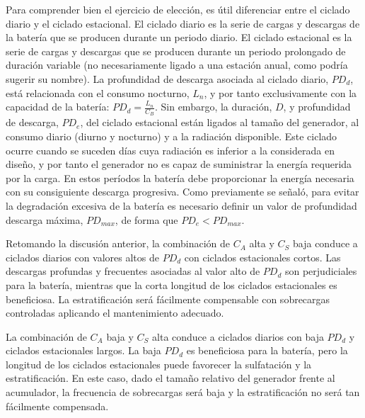 Para comprender bien el ejercicio de elección, es útil diferenciar
entre el ciclado diario y el ciclado estacional. El ciclado diario
es la serie de cargas y descargas de la batería que se producen durante
un periodo diario. El ciclado estacional es la serie de cargas y descargas
que se producen durante un periodo prolongado de duración variable
(no necesariamente ligado a una estación anual, como podría sugerir
su nombre). La profundidad de descarga asociada al ciclado diario,
$PD_{d}$,
está relacionada con el consumo nocturno, $L_{n}$,
y por tanto exclusivamente con la capacidad de la batería: $PD_{d}=\frac{L_{n}}{C_{B}}$.
Sin embargo, la duración, $D$, y profundidad de descarga, $PD_{e}$,
del ciclado estacional están ligados al tamaño del generador, al consumo
diario (diurno y nocturno) y a la radiación disponible. Este ciclado
ocurre cuando se suceden días cuya radiación es inferior a la considerada
en diseño, y por tanto el generador no es capaz de suministrar la
energía requerida por la carga. En estos períodos la batería debe
proporcionar la energía necesaria con su consiguiente descarga progresiva.
Como previamente se señaló, para evitar la degradación excesiva de
la batería es necesario definir un valor de profundidad descarga máxima,
$PD_{max}$, de forma que $PD_{e}<PD_{max}$. 

Retomando la discusión anterior, la combinación de $C_{A}$ alta y
$C_{S}$ baja conduce a ciclados diarios con valores altos de $PD_{d}$
con ciclados estacionales cortos. Las descargas profundas y frecuentes
asociadas al valor alto de $PD_{d}$ son perjudiciales para la batería,
mientras que la corta longitud de los ciclados estacionales es beneficiosa.
La estratificación será fácilmente compensable con sobrecargas controladas
aplicando el mantenimiento adecuado.

La combinación de $C_{A}$ baja y $C_{S}$ alta conduce a ciclados
diarios con baja $PD_{d}$ y ciclados estacionales largos. La baja
$PD_{d}$ es beneficiosa para la batería, pero la longitud de los
ciclados estacionales puede favorecer la sulfatación y la estratificación.
En este caso, dado el tamaño relativo del generador frente al acumulador,
la frecuencia de sobrecargas será baja y la estratificación no será
tan fácilmente compensada. 

